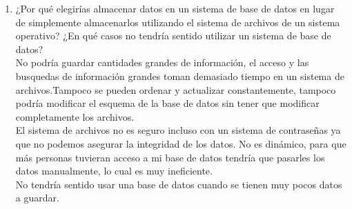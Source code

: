 \documentclass[12pt]{article}
\begin{document}
\begin{enumerate}
	\item ¿Por qué elegirías almacenar datos en un sistema de base
	 de datos en lugar de simplemente almacenarlos utilizando el
	 sistema de archivos de un sistema operativo? ¿En qué casos no
	 tendría sentido utilizar un sistema de base de datos?\\

	 No podría guardar cantidades grandes de información, el acceso
	 y las busquedas de información grandes	toman demasiado tiempo
	 en un sistema de archivos.Tampoco se pueden ordenar y actualizar
	 constantemente, tampoco podría modificar el esquema de la base
	 de datos sin tener que modificar completamente los archivos.\\
	 El sistema de archivos no es seguro incluso con un sistema
	 de contraseñas ya que no podemos asegurar la integridad de los
	 datos. No es dinámico, para que más personas tuvieran acceso a
	 mi base de datos tendría que pasarles los datos manualmente, lo cual es muy ineficiente.\\
	 No tendría sentido usar una base de datos cuando se tienen muy
	 pocos datos a guardar.


\end{enumerate}
\end{document}
